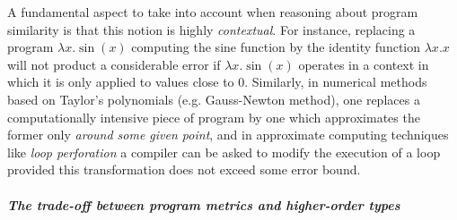   

 
  
% 
%  
%
%
% 
% 
%  
   
 A fundamental aspect to take into account when reasoning about program similarity is that this notion is highly \emph{contextual}. For instance, replacing a program $\lambda x.\sin(x)$ computing the sine function  by the identity function $\lambda x.x$ 
will not product a considerable error if $\lambda x.\sin(x)$
operates in a context in which it is only applied to values close to 0.
Similarly, in numerical methods based on Taylor's polynomials (e.g. Gauss-Newton method), one replaces a 
 computationally intensive piece of program by one which approximates the former only \emph{around some given point}, and in {approximate computing} techniques like \emph{loop perforation} \cite{loopperf} a compiler can be asked to modify the execution of a loop provided this transformation does not exceed some error bound.
 
\subparagraph*{The trade-off between program metrics and higher-order types}



